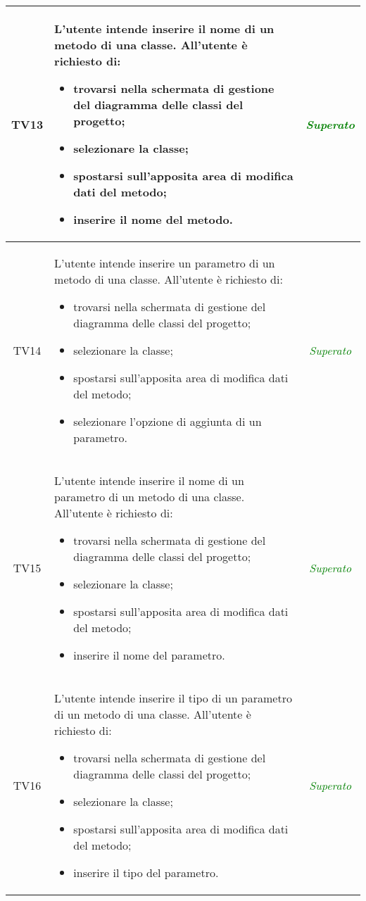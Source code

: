 \begin{longtable}{|c|>{}m{8cm}|c|}
\hypertarget{TV3.1.6.2}{TV13} & L'utente intende inserire il nome di un metodo di una classe.
All'utente è richiesto di:
\begin{itemize}
	\item trovarsi nella schermata di gestione del diagramma delle classi del progetto;
	\item selezionare la classe;
	\item spostarsi sull'apposita area di modifica dati del metodo;
	\item inserire il nome del metodo.
\end{itemize} & \textcolor{Green}{\textit{Superato}}\\ \hline

\hypertarget{TV3.1.6.3}{TV14} & L'utente intende inserire un parametro di un metodo di una classe.
All'utente è richiesto di:
\begin{itemize}
	\item trovarsi nella schermata di gestione del diagramma delle classi del progetto;
	\item selezionare la classe;
	\item spostarsi sull'apposita area di modifica dati del metodo;
	\item selezionare l'opzione di aggiunta di un parametro.
\end{itemize} & \textcolor{Green}{\textit{Superato}}\\ \hline

\hypertarget{TV3.1.6.3.1}{TV15} & L'utente intende inserire il nome di un parametro di un metodo di una classe.
All'utente è richiesto di:
\begin{itemize}
	\item trovarsi nella schermata di gestione del diagramma delle classi del progetto;
	\item selezionare la classe;
	\item spostarsi sull'apposita area di modifica dati del metodo;
	\item inserire il nome del parametro.
\end{itemize} & \textcolor{Green}{\textit{Superato}}\\ \hline

\hypertarget{TV3.1.6.3.2}{TV16} & L'utente intende inserire il tipo di un parametro di un metodo di una classe.
All'utente è richiesto di:
\begin{itemize}
	\item trovarsi nella schermata di gestione del diagramma delle classi del progetto;
	\item selezionare la classe;
	\item spostarsi sull'apposita area di modifica dati del metodo;
	\item inserire il tipo del parametro.
\end{itemize} & \textcolor{Green}{\textit{Superato}}\\ \hline


\end{longtable}
